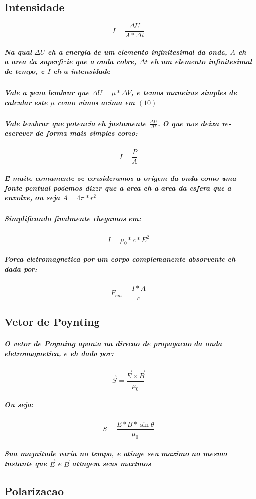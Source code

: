 \documentclass[12pt,twoside, a4paper, twocolumn]{article}
\begin{document}
\subsection*{Intensidade}
\begin{equation}
    I = \frac{\Delta{U}}{A * \Delta{t}}
\end{equation}
\subparagraph*{Na qual $\Delta{U}$ eh a energia de um elemento infinitesimal da onda, $A$ eh a area da superficie que a onda cobre, $\Delta{t}$ eh um elemento infinitesimal de tempo, e $I$ eh a intensidade}
\subparagraph*{Vale a pena lembrar que $\Delta{U} = \mu * \Delta{V}$, e temos maneiras simples de calcular este $\mu$ como vimos acima em $(10)$}
\subparagraph*{Vale lembrar que potencia eh justamente $\frac{\Delta{U}}{\Delta{t}}$. O que nos deixa re-escrever de forma mais simples como:}
\begin{equation}
    I = \frac{P}{A}
\end{equation}
\subparagraph*{E muito comumente se consideramos a origem da onda como uma fonte pontual podemos dizer que a area eh a area da esfera que a envolve, ou seja $A = 4\pi * r^2$}
\subparagraph*{Simplificando finalmente chegamos em:}
\begin{equation}
    I = \mu_0 * c * E^2
\end{equation}
\subparagraph*{Forca eletromagnetica por um corpo complemanente absorvente eh dada por:}
\begin{equation}
    F_{em} = \frac{I * A}{c}
\end{equation}


\subsection{Vetor de Poynting}
\subparagraph*{O vetor de Poynting aponta na direcao de propagacao da onda eletromagnetica, e eh dado por:}
\begin{equation}
    \vec{S} = \frac{\vec{E} \times \vec{B}}{\mu_0}
\end{equation}
\subparagraph*{Ou seja:}
\begin{equation}
    S = \frac{E * B * \sin{\theta}}{\mu_0}
\end{equation}
\subparagraph*{Sua magnitude varia no tempo, e atinge seu maximo no mesmo instante que $\vec{E}$ e $\vec{B}$ atingem seus maximos}

\subsection{Polarizacao}
\end{document}
